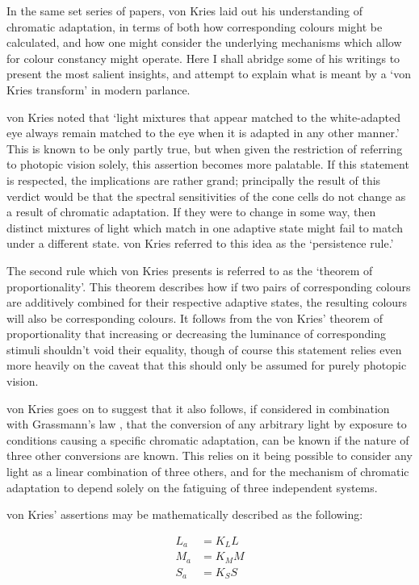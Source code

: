 In the same set series of papers, von Kries laid out his understanding of chromatic adaptation, in terms of both how corresponding colours might be calculated, and how one might consider the underlying mechanisms which allow for colour constancy might operate. Here I shall abridge some of his writings to present the most salient insights, and attempt to explain what is meant by a `von Kries transform' in modern parlance.

von Kries noted that `light mixtures that appear matched to the white-adapted eye always remain matched to the eye when it is adapted in any other manner.' This is known to be only partly true, but when given the restriction of referring to photopic vision solely, this assertion becomes more palatable. If this statement is respected, the implications are rather grand; principally the result of this verdict would be that the spectral sensitivities of the cone cells do not change as a result of chromatic adaptation. If they were to change in some way, then distinct mixtures of light which match in one adaptive state might fail to match under a different state. von Kries referred to this idea as the `persistence rule.'

The second rule which von Kries presents is referred to as the `theorem of proportionality'. This theorem describes how if two pairs of corresponding colours are additively combined for their respective adaptive states, the resulting colours will also be corresponding colours. 
It follows from the von Kries' theorem of proportionality that increasing or decreasing the luminance of corresponding stimuli shouldn't void their equality, though of course this statement relies even more heavily on the caveat that this should only be assumed for purely photopic vision.

von Kries goes on to suggest that it also follows, if considered in combination with Grassmann's law \citep{grassmann_zur_1853}, that the conversion of any arbitrary light by exposure to conditions causing a specific chromatic adaptation, can be known if the nature of three other conversions are known. This relies on it being possible to consider any light as a linear combination of three others, and for the mechanism of chromatic adaptation to depend solely on the fatiguing of three independent systems.

von Kries' assertions may be mathematically described as the following:

\begin{subequations}
\begin{align}
L_{a}&=K_{L}L \\
M_{a}&=K_{M}M \\
S_{a}&=K_{S}S
\end{align}
\end{subequations}

